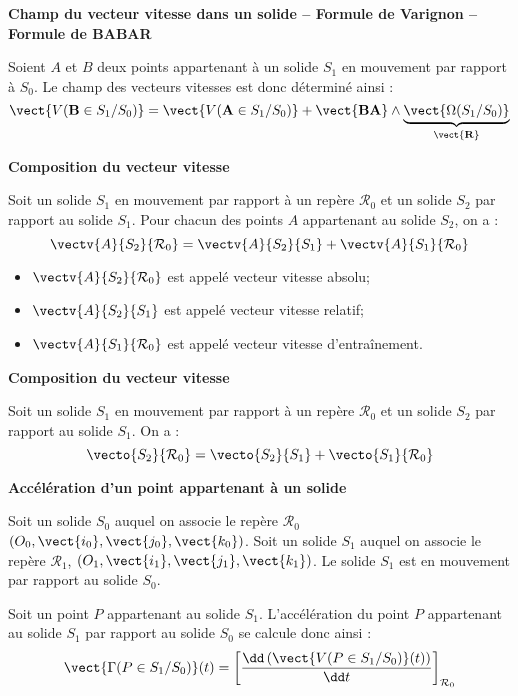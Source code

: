 \begin{resultat}
\textbf{Champ du vecteur vitesse dans un solide -- Formule de Varignon -- Formule de BABAR}

Soient $A$ et $B$ deux points appartenant à un solide $S_1$ en mouvement par rapport à $S_0$. Le champ des vecteurs vitesses est donc déterminé ainsi :
$$
\vect{V(\mathbf{B}\in S_1/S_0)} = \vect{V(\mathbf{A}\in S_1/S_0)} + \vect{\mathbf{BA}}\wedge \underbrace{\vect{\Omega(S_1/S_0)}}_{\mathbf{\vect{R}}}
$$

\end{resultat}


\begin{resultat}
\textbf{Composition du vecteur vitesse}
\label{ref_va}

Soit un solide $S_1$ en mouvement par rapport à un repère $\mathcal{R}_0$ et un solide $S_2$ par rapport au solide $S_1$. Pour chacun des points $A$ appartenant au solide $S_2$, on a :
$$
\vectv{A}{S_2}{\mathcal{R}_0}=
\vectv{A}{S_2}{S_1}+\vectv{A}{S_1}{\mathcal{R}_0}
$$
\end{resultat}


\begin{rem}
\begin{itemize}
\item $\vectv{A}{S_2}{\mathcal{R}_0}$ est appelé vecteur vitesse absolu;
\item $\vectv{A}{S_2}{S_1}$ est appelé vecteur vitesse relatif; 
\item $\vectv{A}{S_1}{\mathcal{R}_0}$ est appelé vecteur vitesse d'entraînement.
\end{itemize}
\end{rem}

\begin{resultat}
\textbf{Composition du vecteur vitesse}

Soit un solide $S_1$ en mouvement par rapport à un repère $\mathcal{R}_0$ et un solide $S_2$ par rapport au solide $S_1$. On a : 
$$
\vecto{S_2}{\mathcal{R}_0}=
\vecto{S_2}{S_1}+\vecto{S_1}{\mathcal{R}_0}
$$
\end{resultat}

\begin{defi}
\textbf{Accélération d'un point appartenant à un solide}

Soit un solide $S_0$ auquel on associe le repère $\mathcal{R}_0$ $\left(O_0,\vect{i_0},\vect{j_0},\vect{k_0} \right)$.  Soit un solide $S_1$ auquel on associe le repère $\mathcal{R}_1$,  $\left(O_1,\vect{i_1},\vect{j_1},\vect{k_1} \right)$. Le solide $S_1$ est en mouvement par rapport au solide $S_0$. 


Soit un point $P$ appartenant au solide $S_1$. L'accélération du point $P$ appartenant au solide $S_1$ par rapport au solide $S_0$ se calcule donc ainsi : 
$$
\vect{\Gamma(P\in S_1/S_0)}(t) = \left[\dfrac{\dd \left( \vect{V(P\in S_1/S_0)}(t)\right)}{\dd t}\right]_{\mathcal{R}_0}
$$

\end{defi}

